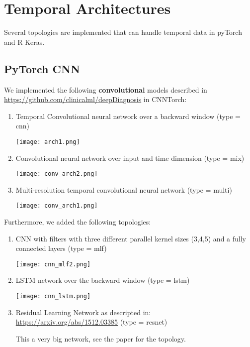 \documentclass[]{article}
\begin{document}
\section{Temporal Architectures}\label{temporal-architectures}

Several topologies are implemented that can handle temporal data in
pyTorch and R Keras.

\subsection{PyTorch CNN}\label{pytorch-cnn}

We implemented the following \textbf{convolutional} models described in
\url{https://github.com/clinicalml/deepDiagnosis} in CNNTorch:

\begin{enumerate}
\def\labelenumi{\arabic{enumi})}
\item
  Temporal Convolutional neural network over a backward window (type =
  cnn)

  \texttt{[image: arch1.png]}
\item
  Convolutional neural network over input and time dimension (type =
  mix)

  \texttt{[image: conv\_arch2.png]}
\item
  Multi-resolution temporal convolutional neural network (type = multi)

  \texttt{[image: conv\_arch1.png]}
\end{enumerate}

Furthermore, we added the following topologies:

\begin{enumerate}
\def\labelenumi{\arabic{enumi})}
\setcounter{enumi}{3}
\item
  CNN with filters with three different parallel kernel sizes (3,4,5)
  and a fully connected layers (type = mlf)

  \texttt{[image: cnn\_mlf2.png]}
\item
  LSTM network over the backward window (type = lstm)

  \texttt{[image: cnn\_lstm.png]}
\item
  Residual Learning Network as descripted in:
  \url{https://arxiv.org/abs/1512.03385} (type = resnet)

  This a very big network, see the paper for the topology.
\end{enumerate}
\end{document}
